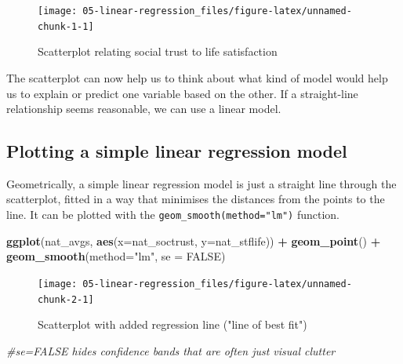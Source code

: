 \documentclass[
]{book}
\newenvironment{Shaded}{\begin{snugshade}}{\end{snugshade}}
\newcommand{\CommentTok}[1]{\textcolor[rgb]{0.56,0.35,0.01}{\textit{#1}}}
\newcommand{\DataTypeTok}[1]{\textcolor[rgb]{0.13,0.29,0.53}{#1}}
\newcommand{\KeywordTok}[1]{\textcolor[rgb]{0.13,0.29,0.53}{\textbf{#1}}}
\newcommand{\NormalTok}[1]{#1}
\newcommand{\OperatorTok}[1]{\textcolor[rgb]{0.81,0.36,0.00}{\textbf{#1}}}
\newcommand{\OtherTok}[1]{\textcolor[rgb]{0.56,0.35,0.01}{#1}}
\newcommand{\StringTok}[1]{\textcolor[rgb]{0.31,0.60,0.02}{#1}}
\begin{document}
\begin{figure}

{\centering \texttt{[image: 05-linear-regression\_files/figure-latex/unnamed-chunk-1-1]} 

}

\caption{Scatterplot relating social trust to life satisfaction}\label{fig:unnamed-chunk-1}
\end{figure}

The scatterplot can now help us to think about what kind of model would
help us to explain or predict one variable based on the other. If a
straight-line relationship seems reasonable, we can use a linear model.

\hypertarget{plotting-a-simple-linear-regression-model}{%
\subsection{Plotting a simple linear regression model}\label{plotting-a-simple-linear-regression-model}}

Geometrically, a simple linear regression model is just a straight line
through the scatterplot, fitted in a way that minimises the distances
from the points to the line. It can be plotted with the
\texttt{geom\_smooth(method="lm")} function.

\begin{Shaded}
\begin{Highlighting}[]
\KeywordTok{ggplot}\NormalTok{(nat_avgs, }\KeywordTok{aes}\NormalTok{(}\DataTypeTok{x=}\NormalTok{nat_soctrust, }\DataTypeTok{y=}\NormalTok{nat_stflife)) }\OperatorTok{+}\StringTok{ }
\StringTok{  }\KeywordTok{geom_point}\NormalTok{() }\OperatorTok{+}\StringTok{ }\KeywordTok{geom_smooth}\NormalTok{(}\DataTypeTok{method=}\StringTok{"lm"}\NormalTok{, }\DataTypeTok{se =} \OtherTok{FALSE}\NormalTok{) }
\end{Highlighting}
\end{Shaded}

\begin{figure}

{\centering \texttt{[image: 05-linear-regression\_files/figure-latex/unnamed-chunk-2-1]} 

}

\caption{Scatterplot with added regression line ("line of best fit")}\label{fig:unnamed-chunk-2}
\end{figure}

\begin{Shaded}
\begin{Highlighting}[]
  \CommentTok{#se=FALSE hides confidence bands that are often just visual clutter}
\end{Highlighting}
\end{Shaded}
\end{document}
